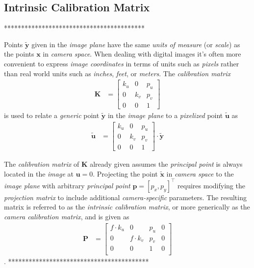 \subsection{Intrinsic Calibration Matrix}
*****************************************\\
\par Points $\mathbf{\tilde{y}}$ given in the \textit{image plane} have the same \textit{units of measure} (or \textit{scale}) as the points $\mathbf{x}$ in \textit{camera space}. When dealing with digital images it's often more convenient to express \textit{image coordinates} in terms of units such as \textit{pixels} rather than real world units such as \textit{inches}, \textit{feet}, or \textit{meters}. The \textit{calibration matrix} 
\begin{equation*}
\begin{split}
\mathbf{K}&=\begin{bmatrix}k_u & 0 & p_u\\ 0 & k_v & p_v\\ 0 & 0 &1\end{bmatrix}
\end{split}
\end{equation*}%
is used to relate a \textit{generic} point $\mathbf{\tilde{y}}$ in the \textit{image plane} to a \textit{pixelized} point $\mathbf{\tilde{u}}$ as
\begin{equation*}
\begin{split}
\mathbf{\tilde{u}}&=\begin{bmatrix}k_u & 0 & p_u\\ 0 & k_v & p_v\\ 0 & 0 &1\end{bmatrix}\cdot\mathbf{\tilde{y}}
\end{split}
\end{equation*}%



\par The \textit{calibration matrix} of $\mathbf{K}$ already given assumes the \textit{principal point} is always located in the \textit{image} at $\mathbf{u}=0$. Projecting the point $\mathbf{\tilde{x}}$ in \textit{camera space} to the \textit{image plane} with arbitrary \textit{principal point} $\mathbf{p}=[p_x,p_y]^\intercal$ requires modifying the \textit{projection matrix} to include additional \textit{camera-specific} parameters. The resulting matrix is referred to as the \textit{intrinsic calibration matrix}, or more generically as the \textit{camera calibration matrix}, and is given as
\begin{equation*}
\begin{split}
\mathbf{P}&=
\begin{bmatrix}
f\cdot k_u & 0 & p_u & 0\\
0 & f\cdot k_v & p_v & 0\\
0 & 0 & 1 & 0\\
\end{bmatrix}
\end{split}
\end{equation*}.
*****************************************\\


